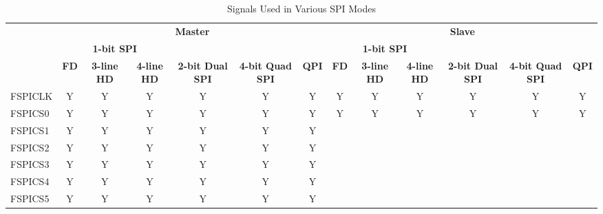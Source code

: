 \documentclass[main\_\_EN.tex]{subfiles}
\begin{document}
\begin{landscape}
\begin{table}[H]
    \centering
    \caption{Signals Used in Various SPI Modes}
    \label{tab:spi-singals-used-in-various-spi-modes}

    \begin{threeparttable}
    \begin{tabular}{ |p{2.0cm} |c|c|c|c|c|c|c|c|c|c|c|c| }
    \hline
        \rowcolor{lightgray}
        & \multicolumn{6}{c|}{\textbf{Master}} & \multicolumn{6}{c|}{\textbf{Slave}} \\\cline{2-13}
        \rowcolor{lightgray}
        & \multicolumn{3}{c|}{\textbf{1-bit SPI}} & & & & \multicolumn{3}{c|}{\textbf{1-bit SPI}} & & & \\ \cline{2-4} \cline{8-10}
        \rowcolor{lightgray}
        \multirow{-3}{*}{\textbf{FSPI Signal}} & \textbf{FD\tnote{1}} & \textbf{3-line HD\tnote{2}} & \textbf{4-line HD} & \multirow{-2}{*}{\textbf{2-bit Dual SPI}} & \multirow{-2}{*}{\textbf{4-bit Quad SPI}} & \multirow{-2}{*}{\textbf{QPI}} & \textbf{FD} & \textbf{3-line HD} & \textbf{4-line HD} & \multirow{-2}{*}{\textbf{2-bit Dual SPI}} & \multirow{-2}{*}{\textbf{4-bit Quad SPI}} & \multirow{-2}{*}{\textbf{QPI}} \\ \hline
FSPICLK                  & Y       & Y       & Y       & Y       & Y       & Y      & Y       & Y      & Y       & Y       & Y       & Y      \\ \hline
FSPICS0                  & Y       & Y       & Y       & Y       & Y       & Y      & Y       & Y      & Y       & Y       & Y       & Y      \\ \hline
FSPICS1                  & Y       & Y       & Y       & Y       & Y       & Y      &         &        &         &         &         &        \\ \hline
FSPICS2                  & Y       & Y       & Y       & Y       & Y       & Y      &         &        &         &         &         &        \\ \hline
FSPICS3                  & Y       & Y       & Y       & Y       & Y       & Y      &         &        &         &         &         &        \\ \hline
FSPICS4                  & Y       & Y       & Y       & Y       & Y       & Y      &         &        &         &         &         &        \\ \hline
FSPICS5                  & Y       & Y       & Y       & Y       & Y       & Y      &         &        &         &         &         &        \\ \hline

\end{tabular}
\end{threeparttable}
\end{table}
\end{landscape}
\end{document}
